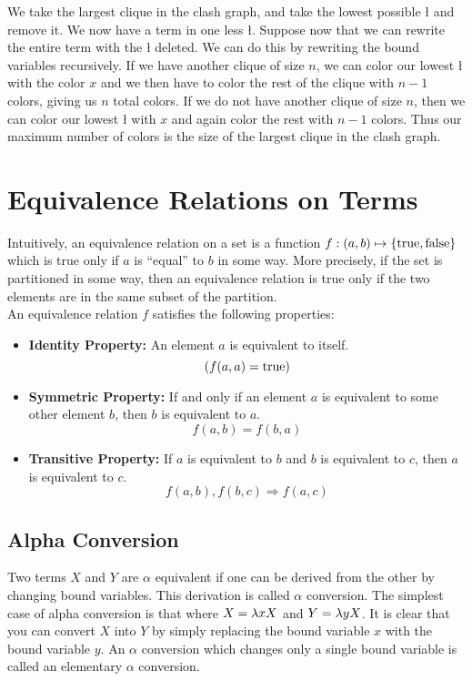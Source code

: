 We take the largest clique in the clash graph, and take the lowest possible \l{} and remove it. We now have a term in one less \l. Suppose now that we can rewrite the entire term with the \l{} deleted. We can do this by rewriting the bound variables recursively. If we have another clique of size $n$, we can color our lowest \l{} with the color $x$ and we then have to color the rest of the clique with $n - 1$ colors, giving us $n$ total colors. If we do not have another clique of size $n$, then we can color our lowest \l{} with $x$ and again color the rest with $n - 1$ colors. Thus our maximum number of colors is the size of the largest clique in the clash graph.\\

\section{Equivalence Relations on Terms}
Intuitively, an equivalence relation on a set is a function $f: (a,b) \mapsto \{\hbox{true},\hbox{false}\}$ which is true only if $a$ is ``equal'' to $b$ in some way. More precisely, if the set is partitioned in some way, then an equivalence relation is true only if the two elements are in the same subset of the partition.\\

An equivalence relation $f$ satisfies the following properties:
\begin{itemize}
  \item \textbf{Identity Property:} An element $a$ is equivalent to itself.
    \begin{equation*}
      (f(a,a) = \hbox{true})
    \end{equation*}
  \item \textbf{Symmetric Property:} If and only if an element $a$ is equivalent to some other element $b$, then $b$ is equivalent to $a$.
    \begin{equation*}
      f(a,b) = f(b,a)
    \end{equation*}
  \item \textbf{Transitive Property:} If $a$ is equivalent to $b$ and $b$ is equivalent to $c$, then $a$ is equivalent to $c$.
    \begin{equation*}
      f(a,b),f(b,c)\Rightarrow f(a,c)
    \end{equation*}
\end{itemize}

\subsection{Alpha Conversion}
Two terms $X$ and $Y$ are $\alpha$ equivalent if one can be derived from the other by changing bound variables. This derivation is called $\alpha$ conversion. The simplest case of alpha conversion is that where $X = \lambda x X$ and $Y = \lambda y X$. It is clear that you can convert $X$ into $Y$ by simply replacing the bound variable $x$ with the bound variable $y$. An $\alpha$ conversion which changes only a single bound variable is called an elementary $\alpha$ conversion.\\

